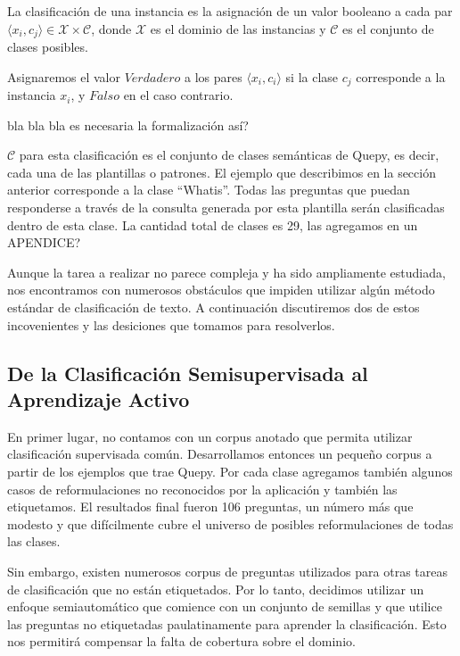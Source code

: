 \begin{definition}
La clasificación de una instancia es la asignación de un valor booleano a cada par $\langle x_i, c_j \rangle \in \mathcal{X} \times \mathcal{C}$, donde $\mathcal{X}$ es el dominio de las instancias y $\mathcal{C}$ es el conjunto de clases posibles.
\end{definition}

Asignaremos el valor $Verdadero$ a los pares $\langle x_i, c_i \rangle$ si la clase $c_j$ corresponde a la instancia $x_i$, y $Falso$ en el caso contrario.

bla bla bla es necesaria la formalización así?

$\mathcal{C}$ para esta clasificación es el conjunto de clases semánticas de Quepy, es decir, cada una de las plantillas o patrones. El ejemplo que describimos en la sección anterior corresponde a la clase ``Whatis''. Todas las preguntas que puedan responderse a través de la consulta generada por esta plantilla serán clasificadas dentro de esta clase. La cantidad total de clases es 29, las agregamos en un APENDICE?




Aunque la tarea a realizar no parece compleja y ha sido ampliamente estudiada, nos encontramos con numerosos obstáculos que impiden utilizar algún método estándar de clasificación de texto. A continuación discutiremos dos de estos incovenientes y las desiciones que tomamos para resolverlos.

\subsection{De la Clasificación Semisupervisada al Aprendizaje Activo}

En primer lugar, no contamos con un corpus anotado que permita utilizar clasificación supervisada común. Desarrollamos entonces un pequeño corpus a partir de los ejemplos que trae Quepy. Por cada clase agregamos también algunos casos de reformulaciones no reconocidos por la aplicación y también las etiquetamos. El resultados final fueron 106 preguntas, un número más que modesto y que difícilmente cubre el universo de posibles reformulaciones de todas las clases.

Sin embargo, existen numerosos corpus de preguntas utilizados para otras tareas de clasificación que no están etiquetados. Por lo tanto, decidimos utilizar un enfoque semiautomático que comience con un conjunto de semillas y que utilice las preguntas no etiquetadas paulatinamente para aprender la clasificación. Esto nos permitirá compensar la falta de cobertura sobre el dominio.

